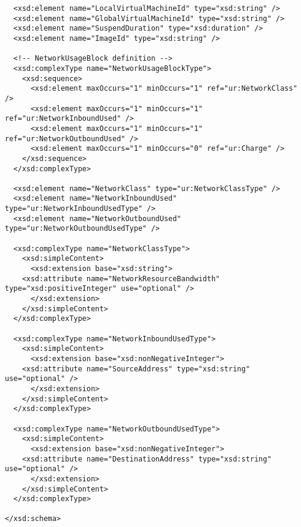 \begin{verbatim}
  <xsd:element name="LocalVirtualMachineId" type="xsd:string" />
  <xsd:element name="GlobalVirtualMachineId" type="xsd:string" />
  <xsd:element name="SuspendDuration" type="xsd:duration" />
  <xsd:element name="ImageId" type="xsd:string" />

  <!-- NetworkUsageBlock definition -->
  <xsd:complexType name="NetworkUsageBlockType">
    <xsd:sequence>
      <xsd:element maxOccurs="1" minOccurs="1" ref="ur:NetworkClass" />
      <xsd:element maxOccurs="1" minOccurs="1" ref="ur:NetworkInboundUsed" />
      <xsd:element maxOccurs="1" minOccurs="1" ref="ur:NetworkOutboundUsed" />
      <xsd:element maxOccurs="1" minOccurs="0" ref="ur:Charge" />
    </xsd:sequence>
  </xsd:complexType>

  <xsd:element name="NetworkClass" type="ur:NetworkClassType" />
  <xsd:element name="NetworkInboundUsed" type="ur:NetworkInboundUsedType" />
  <xsd:element name="NetworkOutboundUsed" type="ur:NetworkOutboundUsedType" />

  <xsd:complexType name="NetworkClassType">
    <xsd:simpleContent>
      <xsd:extension base="xsd:string">
	<xsd:attribute name="NetworkResourceBandwidth" type="xsd:positiveInteger" use="optional" />
      </xsd:extension>
    </xsd:simpleContent>
  </xsd:complexType>

  <xsd:complexType name="NetworkInboundUsedType">
    <xsd:simpleContent>
      <xsd:extension base="xsd:nonNegativeInteger">
	<xsd:attribute name="SourceAddress" type="xsd:string" use="optional" />
      </xsd:extension>
    </xsd:simpleContent>
  </xsd:complexType>

  <xsd:complexType name="NetworkOutboundUsedType">
    <xsd:simpleContent>
      <xsd:extension base="xsd:nonNegativeInteger">
	<xsd:attribute name="DestinationAddress" type="xsd:string" use="optional" />
      </xsd:extension>
    </xsd:simpleContent>
  </xsd:complexType>

</xsd:schema>
\end{verbatim}\normalsize

